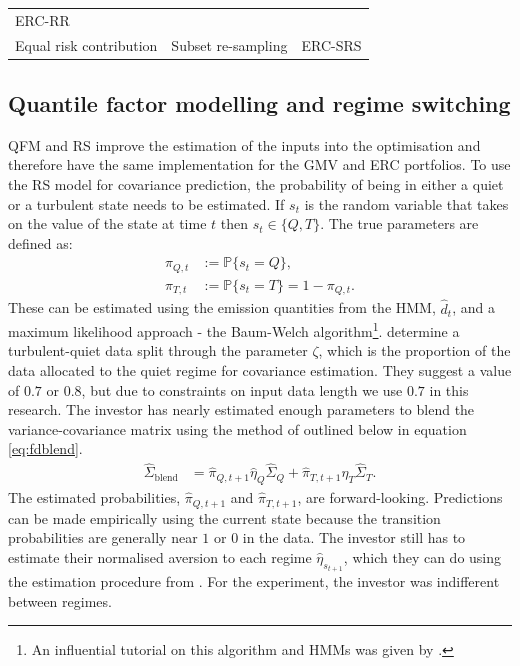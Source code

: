 \documentclass[
]{article}
\begin{document}
\begin{longtable}[]{@{}lll@{}}
\begin{minipage}[t]{0.15\columnwidth}
ERC-RR\strut
\end{minipage}\tabularnewline
\begin{minipage}[t]{0.26\columnwidth}\raggedright
Equal risk contribution\strut
\end{minipage} & \begin{minipage}[t]{0.51\columnwidth}\raggedright
Subset re-sampling\strut
\end{minipage} & \begin{minipage}[t]{0.15\columnwidth}\raggedright
ERC-SRS\strut
\end{minipage}\tabularnewline
\bottomrule
\end{longtable}

\hypertarget{quantile-factor-modelling-and-regime-switching}{%
\subsection{Quantile factor modelling and regime switching}\label{quantile-factor-modelling-and-regime-switching}}

QFM and RS improve the estimation of the inputs into the optimisation and therefore have the same
implementation for the GMV and ERC portfolios. To use the RS model for covariance prediction, the
probability of being in either a quiet or a turbulent state needs to be estimated. If \(s_t\) is the
random variable that takes on the value of the state at time \(t\) then \(s_t \in \{Q, T\}\). The true
parameters are defined as:
\begin{align*}
\pi_{Q, t} &:= \mathbb{P}\{s_t = Q\}, \\
\pi_{T, t} &:= \mathbb{P}\{s_t = T\} = 1 - \pi_{Q, t}.
\end{align*}
These can be estimated using the emission quantities from the HMM, \(\hat{d}_t\), and a maximum
likelihood approach - the Baum-Welch algorithm\footnote{An influential tutorial on this algorithm and
  HMMs was given by \citet{R89}.}. \citet{K12} determine a turbulent-quiet data split through the parameter \(\zeta\),
which is the proportion of the data allocated to the quiet regime for covariance estimation. They
suggest a value of \(0.7\) or \(0.8\), but due to constraints on input data length we use \(0.7\) in this
research. The investor has nearly estimated enough parameters to blend the variance-covariance matrix
using the method of \citet{FD18} outlined below in equation \eqref{eq:fdblend}.
\begin{align}
\hat{\Sigma}_{\text{blend}} & = \hat{\pi}_{Q, t + 1} \hat{\eta}_Q \hat{\Sigma}_Q + \hat{\pi}_{T, t + 1} \hat{\eta}_T \hat{\Sigma}_T. \label{eq:fdblend}
\end{align}
The estimated probabilities, \(\hat{\pi}_{Q, t + 1}\) and \(\hat{\pi}_{T, t + 1}\), are forward-looking.
Predictions can be made empirically using the current state because the transition probabilities are
generally near \(1\) or \(0\) in the data. The investor still has to estimate their normalised aversion to
each regime \(\hat{\eta}_{s_{t+1}}\), which they can do using the estimation procedure from \citet{B18}. For
the experiment, the investor was indifferent between regimes.
\end{document}
